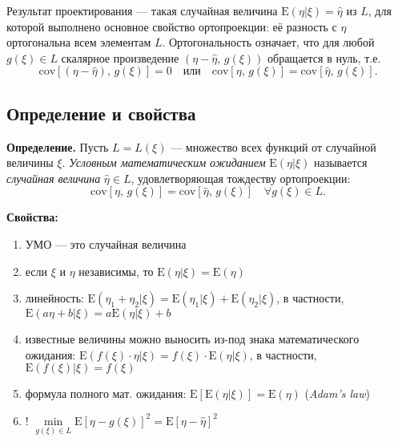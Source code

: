 \documentclass[11pt,a4paper]{article}
\providecommand{\tightlist}{%
      \setlength{\itemsep}{0pt}\setlength{\parskip}{0pt}}
\begin{document}
    \begin{center}
    \end{center}

    Результат проектирования --- такая случайная величина
\(\mathrm{E}(\eta|\xi) = \hat{\eta}\) из \(L\), для которой выполнено
основное свойство ортопроекции: её разность с \(\eta\) ортогональна всем
элементам \(L\). Ортогональность означает, что для любой
\(g(\xi) \in L\) скалярное произведение
\((\eta - \hat{\eta},\, g(\xi))\) обращается в нуль, т.е. \[
  \mathrm{cov}\left[(\eta - \hat{\eta}),\, g(\xi) \right] = 0 \quad \mathrm{или} \quad \mathrm{cov}\left[ \eta,\, g(\xi) \right] = \mathrm{cov}\left[ \hat{\eta},\, g(\xi) \right].
\]

    \hypertarget{ux43eux43fux440ux435ux434ux435ux43bux435ux43dux438ux435-ux438-ux441ux432ux43eux439ux441ux442ux432ux430}{%
\subsection{Определение и
свойства}\label{ux43eux43fux440ux435ux434ux435ux43bux435ux43dux438ux435-ux438-ux441ux432ux43eux439ux441ux442ux432ux430}}

\textbf{Определение.} Пусть \(L = L(\xi)\) --- множество всех функций от
случайной величины \(\xi\). \emph{Условным математическим ожиданием}
\(\mathrm{E}(\eta|\xi)\) называется \emph{случайная величина}
\(\hat{\eta} \in L\), удовлетворяющая тождеству ортопроекции: \[
  \mathrm{cov}\left[ \eta,\, g(\xi) \right] = \mathrm{cov}\left[ \hat{\eta},\, g(\xi) \right] \quad \forall g(\xi) \in L.
\]

    \textbf{Свойства:}

\begin{enumerate}
\def\labelenumi{\arabic{enumi}.}
\tightlist
\item
  УМО --- это случайная величина
\item
  если \(\xi\) и \(\eta\) независимы, то
  \(\mathrm{E}(\eta|\xi) = \mathrm{E}(\eta)\)
\item
  линейность:
  \(\mathrm{E}(\eta_1 + \eta_2|\xi) = \mathrm{E}(\eta_1|\xi) + \mathrm{E}(\eta_2|\xi)\),
  в частности, \(\mathrm{E}(a\eta + b|\xi) = a\mathrm{E}(\eta|\xi) + b\)
\item
  известные величины можно выносить из-под знака математического
  ожидания:
  \(\mathrm{E}(f(\xi) \cdot \eta|\xi) = f(\xi) \cdot \mathrm{E}(\eta|\xi)\),
  в частности, \(\mathrm{E}(f(\xi)|\xi) = f(\xi)\)
\item
  формула полного мат. ожидания:
  \(\mathrm{E}\left[ \mathrm{E}(\eta|\xi) \right] = \mathrm{E}(\eta)\)
  (\emph{Adam's law})
\item
  !
  \(\min\limits_{g(\xi) \in L} \mathrm{E}[\eta - g(\xi)]^2 = \mathrm{E}[\eta - \hat{\eta}]^2\)
\end{enumerate}
\end{document}
